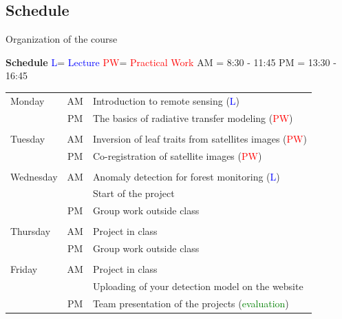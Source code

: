 \documentclass[aspectratio=169, 9pt]{beamer}
\renewcommand{\L}{\boldsymbol{\Lambda}}
\renewcommand{\L}{\textcolor{blue}{L}}
\newcommand{\PW}{\textcolor{red}{PW}}
\begin{document}
\subsection{Schedule}
\begin{frame}{Organization of the course}

\textbf{Schedule} \quad \L = \textcolor{blue}{Lecture} \quad \PW = \textcolor{red}{Practical Work} \quad AM = 8:30 - 11:45 \quad PM = 13:30 - 16:45 \\ \vspace{0.3cm}
\begin{tabular}{lcl}
	Monday & AM & Introduction to remote sensing (\L)\\
		   & PM & The basics of radiative transfer modeling (\PW) \\
		   & & \\
	Tuesday & AM & Inversion of leaf traits from satellites images (\PW) \\
		    & PM & Co-registration of satellite images (\PW) \\
		    & & \\
	Wednesday & AM & Anomaly detection for forest monitoring (\L) \\
			 & & Start of the project \\
			 & PM & Group work outside class \\
			 & & \\
	Thursday & AM & Project in class \\
			& PM & Group work outside class\\
			& & \\
	Friday & AM & Project in class \\
	& & Uploading of your detection model on the website \\
	& PM & Team presentation of the projects (\textcolor{green}{evaluation})
\end{tabular}

\end{frame}
\end{document}
